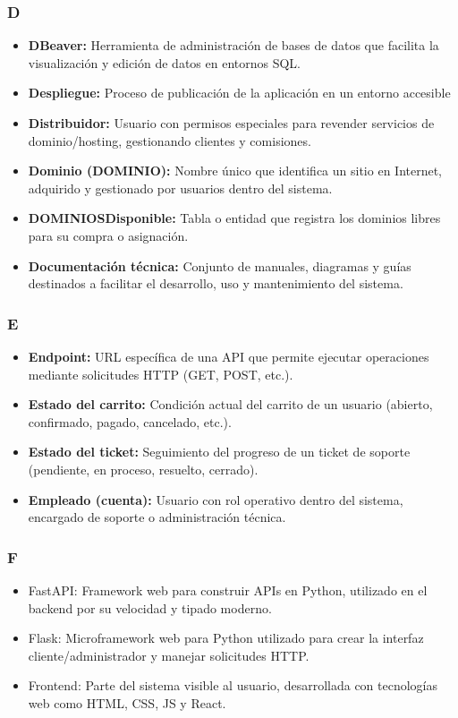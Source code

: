 \subsubsection*{D}
\begin{itemize}
    \item \textbf{DBeaver:} Herramienta de administración de bases de datos que facilita la visualización y edición de datos en entornos SQL.
    \item \textbf{Despliegue:} Proceso de publicación de la aplicación en un entorno accesible
    \item \textbf{Distribuidor:} Usuario con permisos especiales para revender servicios de dominio/hosting, gestionando clientes y comisiones.
    \item \textbf{Dominio (DOMINIO):} Nombre único que identifica un sitio en Internet, adquirido y gestionado por usuarios dentro del sistema.
    \item \textbf{DOMINIOSDisponible:} Tabla o entidad que registra los dominios libres para su compra o asignación.
    \item \textbf{Documentación técnica:} Conjunto de manuales, diagramas y guías destinados a facilitar el desarrollo, uso y mantenimiento del sistema.
\end{itemize}

\subsubsection*{E}
\begin{itemize}
    \item \textbf{Endpoint:} URL específica de una API que permite ejecutar operaciones mediante solicitudes HTTP (GET, POST, etc.).
    \item \textbf{Estado del carrito:} Condición actual del carrito de un usuario (abierto, confirmado, pagado, cancelado, etc.).
    \item \textbf{Estado del ticket:} Seguimiento del progreso de un ticket de soporte (pendiente, en proceso, resuelto, cerrado).
    \item \textbf{Empleado (cuenta):} Usuario con rol operativo dentro del sistema, encargado de soporte o administración técnica.

\end{itemize}

\subsubsection*{F}
\begin{itemize}
    \item {FastAPI:} Framework web para construir APIs en Python, utilizado en el backend por su velocidad y tipado moderno.
    \item {Flask:} Microframework web para Python utilizado para crear la interfaz cliente/administrador y manejar solicitudes HTTP.
    \item {Frontend:} Parte del sistema visible al usuario, desarrollada con tecnologías web como HTML, CSS, JS y React.
\end{itemize}


